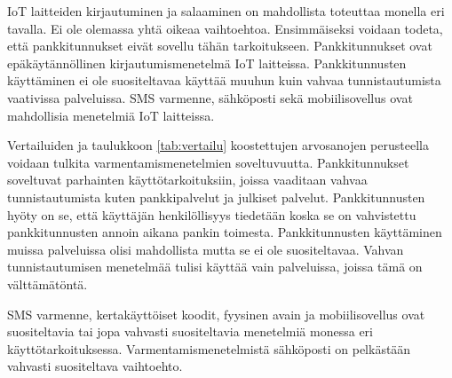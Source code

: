 IoT laitteiden kirjautuminen ja salaaminen on mahdollista toteuttaa monella eri tavalla. Ei ole olemassa yhtä oikeaa vaihtoehtoa. Ensimmäiseksi voidaan todeta, että pankkitunnukset eivät sovellu tähän tarkoitukseen. Pankkitunnukset ovat epäkäytännöllinen kirjautumismenetelmä IoT laitteissa. Pankkitunnusten käyttäminen ei ole suositeltavaa käyttää muuhun kuin vahvaa tunnistautumista vaativissa palveluissa. SMS varmenne, sähköposti sekä mobiilisovellus ovat mahdollisia menetelmiä IoT laitteissa. \citep{el2019survey} \citep{lucia2019device}




Vertailuiden ja taulukkoon \ref{tab:vertailu} koostettujen arvosanojen perusteella voidaan tulkita varmentamismenetelmien soveltuvuutta. Pankkitunnukset soveltuvat parhainten käyttötarkoituksiin, joissa vaaditaan vahvaa tunnistautumista kuten pankkipalvelut ja julkiset palvelut. Pankkitunnusten hyöty on se, että käyttäjän henkilöllisyys tiedetään koska se on vahvistettu pankkitunnusten annoin aikana pankin toimesta. Pankkitunnusten käyttäminen muissa palveluissa olisi mahdollista mutta se ei ole suositeltavaa. Vahvan tunnistautumisen menetelmää tulisi käyttää vain palveluissa, joissa tämä on välttämätöntä. 

 
SMS varmenne, kertakäyttöiset koodit, fyysinen avain ja mobiilisovellus ovat suositeltavia tai jopa vahvasti suositeltavia menetelmiä monessa eri käyttötarkoituksessa.
Varmentamismenetelmistä sähköposti on pelkästään vahvasti suositeltava vaihtoehto. 
